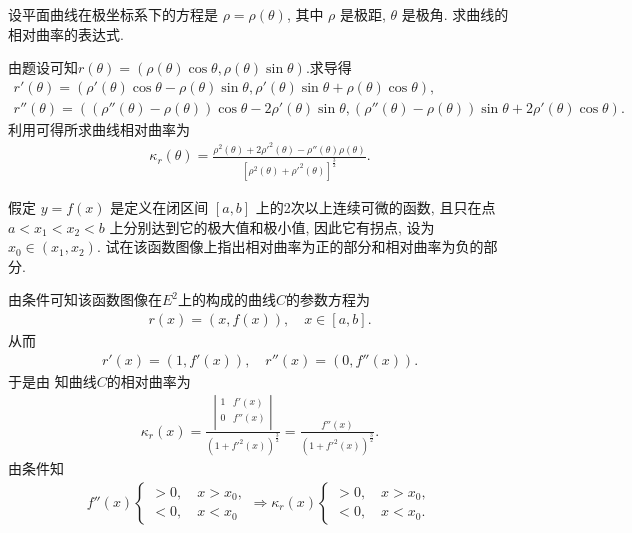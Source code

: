 \documentclass[../../main.tex]{subfiles}%
\begin{document}
\begin{example}
设平面曲线在极坐标系下的方程是 $\rho=\rho(\theta)$, 其中 $\rho$ 是极距, $\theta$ 是极角. 求曲线的相对曲率的表达式.
\end{example}
\begin{solution}

由题设可知$r \left( \theta \right) =\left( \rho(\theta)\cos \theta ,\rho(\theta)\sin \theta \right)$.求导得
\begin{gather*}
r'(\theta)=\left( \rho'(\theta)\cos\theta-\rho(\theta)\sin\theta,\rho'(\theta)\sin\theta+\rho(\theta)\cos\theta \right),\\
r''(\theta)=\left( \left( \rho''(\theta)-\rho(\theta) \right)\cos\theta-2\rho'(\theta)\sin\theta,\left( \rho''(\theta)-\rho(\theta) \right)\sin\theta+2\rho'(\theta)\cos\theta \right).
\end{gather*}
利用可得所求曲线相对曲率为
\begin{align*}
\kappa_r(\theta)=\frac{\rho^2(\theta)+2\rho'^2(\theta)-\rho''(\theta)\rho(\theta)}{\left[ \rho^2(\theta)+\rho'^2(\theta) \right]^{\frac{3}{2}}}.
\end{align*}

\end{solution}

\begin{example}
假定 $y=f(x)$ 是定义在闭区间 $[a,b]$ 上的2次以上连续可微的函数, 且只在点 $a<x_1<x_2<b$ 上分别达到它的极大值和极小值, 因此它有拐点, 设为 $x_0\in(x_1,x_2)$. 试在该函数图像上指出相对曲率为正的部分和相对曲率为负的部分.
\end{example}
\begin{solution}

由条件可知该函数图像在$E^2$上的构成的曲线$C$的参数方程为
\begin{align*}
r(x) = \left( x,f(x) \right) ,\quad x\in \left[ a,b \right] .
\end{align*}
从而
\begin{align*}
r'(x) = \left( 1,f'(x) \right) ,\quad r''(x) = \left( 0,f''(x) \right) .
\end{align*}
于是由
知曲线$C$的相对曲率为
\begin{align*}
\kappa _r(x)=\frac{\left| \begin{matrix}
1&		f'(x)\\
0&		f'' (x)\\
\end{matrix} \right|}{\left( 1+f'^2(x) \right)^{\frac{3}{2}}}=\frac{f'' (x)}{\left( 1+f'^2(x) \right)^{\frac{3}{2}}}.
\end{align*}
由条件知
\begin{align*}
f''(x)
\begin{cases}
>0,\quad x>x_0, \\
<0,\quad x<x_0
\end{cases}\Longrightarrow \kappa_r(x)\begin{cases}
>0,\quad x>x_0, \\
<0,\quad x<x_0.
\end{cases}
\end{align*}

\end{solution}
\end{document}
